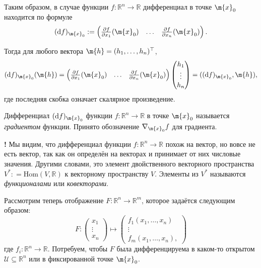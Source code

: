 Таким образом, в случае функции $f:\mathbb{R}^n \to \mathbb{R}$ дифференциал в точке $\m{x}_0$ находится по формуле
\[
 (\mathrm{d}f)_{\m{x}_0}: = \begin{pmatrix}
     \frac{\partial f}{\partial x_1}(\m{x}_0) & \ldots & \frac{\partial f}{\partial x_n}(\m{x}_0)
 \end{pmatrix}.
\]

Тогда для любого вектора $\m{h} = (h_1,\ldots, h_n)^\top$,
\[
 (\mathrm{d}f)_{\m{x}_0}(\m{h}) =  \begin{pmatrix}
     \frac{\partial f}{\partial x_1}(\m{x}_0) & \ldots & \frac{\partial f}{\partial x_n}(\m{x}_0)
 \end{pmatrix} \begin{pmatrix}
     h_1 \\ \vdots \\ h_n
 \end{pmatrix} = ((\mathrm{d}f)_{\m{x}_0}, \m{h}),
\]
где последняя скобка означает скалярное произведение.

\begin{definition}
    Дифференциал $(\mathrm{d}f)_{\m{x}_0}$ функции $f: \mathbb{R}^n \to \mathbb{R}$ в точке $\m{x}_0$ называется \textit{градиентом} функции. Принято обозначение $\nabla_{\m{x}_0}f$ для градиента.
\end{definition}

\begin{mydanger}{\bf{!}}
 Мы видим, что дифференциал функции $f:\mathbb{R}^n \to \mathbb{R}$ похож на вектор, но вовсе не есть вектор, так как он определён на векторах и принимает от них числовые значения. Другими словами, это элемент двойственного векторного пространства $V^*: = \mathrm{Hom}(V, \mathbb{R})$ к векторному пространству $V$. Элементы из $V^*$ называются \textit{функционалами} или \textit{ковекторами}.    
\end{mydanger}


Рассмотрим теперь отображение $F: \mathbb{R}^n \to \mathbb{R}^m$, которое задаётся следующим образом:
\[
 F: \begin{pmatrix}
      x_1 \\ \vdots \\ x_n
 \end{pmatrix} \mapsto 
 \begin{pmatrix}
     f_1(x_1, \ldots, x_n) \\ \vdots \\ f_m(x_1, \ldots, x_n),
 \end{pmatrix}
\]
где $f_i:\mathbb{R}^n \to \mathbb{R}$. Потребуем, чтобы $F$ была дифференцируема в каком-то открытом $\mathscr{U} \subseteq \mathbb{R}^n$ или в фиксированной точке $\m{x}_0$. 

